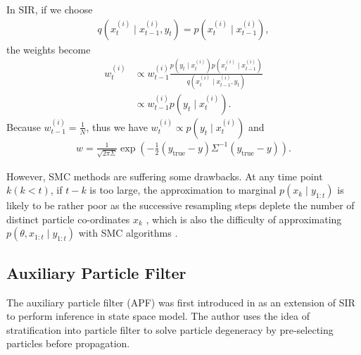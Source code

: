In SIR, if we choose
\begin{align*}
q(x_t ^{(i)}\mid x_{t-1}^{(i)},y_t ) = p(x_t ^{(i)}\mid x_{t-1}^{(i)}),
\end{align*}
the weights become
\begin{align*}
w_t ^{(i)}&\propto w_{t-1}^{(i)}\frac{ p(y_t \mid x_{t}^{(i)}) p(x_t ^{(i)}\mid x_{t-1}^{(i)}) }{q(x_t ^{(i)}\mid x_{t-1}^{(i)},y_t ) }\\
&\propto w_{t-1}^{(i)}p(y_t \mid x_{t}^{(i)}).
\end{align*}
Because $w_{t-1}^{(i)}=\frac{1}{N}$, thus we have $w_t ^{(i)} \propto p(y_t \mid x_{t}^{(i)})$ and
\begin{align*}
w=\frac{1}{\sqrt{2\pi\Sigma}}\exp\left(-\frac{1}{2} (y_{\mbox{true}}-y)\Sigma^{-1}(y_{\mbox{true}}-y)\right).
\end{align*}

However, SMC methods are suffering some drawbacks. At any time point $k (k<t)$, if $t-k$ is too large, the approximation to marginal $p(x_k\mid y_{1:t})$ is likely to be rather poor as the successive resampling steps deplete the number of distinct particle co-ordinates $x_k$ \cite{andrieu2010particle}, which is also the difficulty of approximating $p(\theta,x_{1:t}\mid y_{1:t})$ with SMC algorithms 
\cite{andrieu1999sequential} \cite{fearnhead2002markov} \cite{storvik2002particle}. 




\subsection{Auxiliary Particle Filter}

The auxiliary particle filter (APF) was first introduced in \cite{pitt1999filtering} as an extension of SIR to perform inference in state space model. The author uses the idea of stratification into particle filter to solve particle degeneracy by pre-selecting particles before propagation. 

